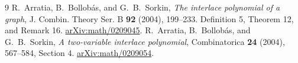 \documentclass[11pt]{article}
\begin{document}
\begin{thebibliography}{9}\small
{} R.~Arratia, B.~Bollob\'as, and G.~B.~Sorkin,
\emph{The interlace polynomial of a graph},
J. Combin. Theory Ser. B \textbf{92} (2004), 199--233.
Definition 5, Theorem 12, and Remark 16.
\href{https://arxiv.org/abs/math/0209045}{arXiv:math/0209045}.
 R.~Arratia, B.~Bollob\'as, and G.~B.~Sorkin,
\emph{A two-variable interlace polynomial},
Combinatorica \textbf{24} (2004), 567--584, Section 4.
\href{https://arxiv.org/abs/math/0209054}{arXiv:math/0209054}.
\end{thebibliography}
\end{document}
